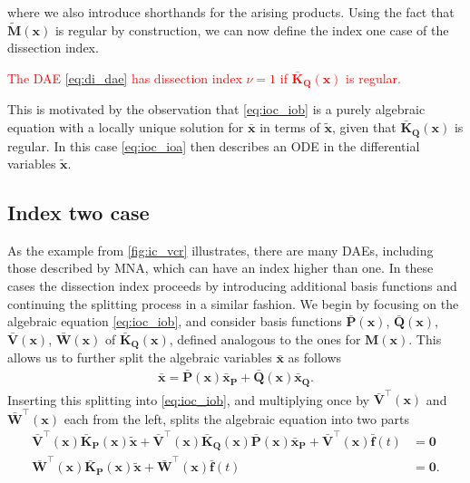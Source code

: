 \documentclass[AMA,STIX1COL]{WileyNJD-v2}
\newcommand{\mb}[1]{\mathbf{#1}}
\newcommand{\mbt}[1]{\tilde{\mathbf{#1}}}
\newcommand{\mbb}[1]{\bar{\mathbf{#1}}}
\newcommand{\T}{{\!\top}}
\begin{document}
where we also introduce shorthands for the arising products. Using the fact that $\mbt{M}(\mb{x})$ is regular by construction\cite{jansen2014}, we can now define the index one case of the dissection index.
\textcolor{red}{\begin{definition}
    \label{def:ioc_io}
    The DAE \eqref{eq:di_dae} has dissection index $\nu = 1$ if $\mbb{K}_\mb{Q}(\mb{x})$ is regular.
\end{definition}}
This is motivated by the observation that \eqref{eq:ioc_iob} is a purely algebraic equation with a locally unique solution for $\mbb{x}$ in terms of $\mbt{x}$, given that $\mbb{K}_\mb{Q}(\mb{x})$ is regular. In this case \eqref{eq:ioc_ioa} then describes an ODE in the differential variables $\mbt{x}$.

\subsection{Index two case}
\label{subsec:itc}
As the example from \autoref{fig:ic_vcr} illustrates, there are many DAEs, including those described by MNA, which can have an index higher than one. In these cases the dissection index proceeds by introducing additional basis functions and continuing the splitting process in a similar fashion. We begin by focusing on the algebraic equation \eqref{eq:ioc_iob}, and consider basis functions $\mbb{P}(\mb{x})$, $\mbb{Q}(\mb{x})$, $\mbb{V}(\mb{x})$, $\mbb{W}(\mb{x})$ of $\mbb{K}_\mb{Q}(\mb{x})$, defined analogous to the ones for $\mb{M}(\mb{x})$. This allows us to further split the algebraic variables $\mbb{x}$ as follows
\begin{align}
    \mbb{x} = \mbb{P}(\mb{x}) \mbb{x}_\mb{P} + \mbb{Q}(\mb{x}) \mbb{x}_\mb{Q}. \label{eq:itc_xb}
\end{align}
Inserting this splitting into \eqref{eq:ioc_iob}, and multiplying once by $\mbb{V}^\T (\mb{x})$ and $\mbb{W}^\T (\mb{x})$ each from the left, splits the algebraic equation into two parts
\begin{subequations}
    \label{eq:itc_iti}
    \begin{align}
        \mbb{V}^\T (\mb{x}) \mbb{K}_\mb{P}(\mb{x}) \mbt{x} + \mbb{V}^\T (\mb{x}) \mbb{K}_\mb{Q}(\mb{x}) \mbb{P}(\mb{x}) \mbb{x}_\mb{P} + \mbb{V}^\T (\mb{x}) \mbb{f}(t) &= \mb{0} \label{eq:itc_itia}\\
        \mbb{W}^\T (\mb{x}) \mbb{K}_\mb{P}(\mb{x}) \mbt{x} + \mbb{W}^\T (\mb{x}) \mbb{f}(t) &= \mb{0}. \label{eq:itc_itib}
    \end{align}
\end{subequations}
\end{document}
